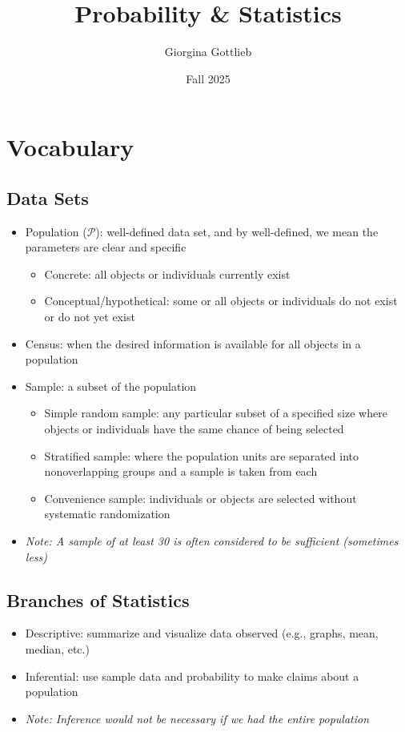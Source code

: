 \documentclass[12pt]{article}
\title{\textbf{Probability \& Statistics}}
\author{Giorgina Gottlieb}
\date{Fall 2025}
\begin{document}
\maketitle

\section{Vocabulary}

\subsection{Data Sets}
    \begin{itemize}
        \item Population ($\mathcal{P}$): well-defined data set, and by well-defined, we mean the parameters are clear and specific
            \begin{itemize}[label=--]
            \item Concrete: all objects or individuals currently exist
            \item Conceptual/hypothetical: some or all objects or individuals do not exist or do not yet exist
            \end{itemize}
        \item Census: when the desired information is available for all objects in a population
        \item Sample: a subset of the population
            \begin{itemize}[label=--]
                \item Simple random sample: any particular subset of a specified size where objects or individuals have the same chance of being selected
                \item Stratified sample: where the population units are separated into nonoverlapping groups and a sample is taken from each
                \item Convenience sample: individuals or objects are selected without systematic randomization
            \end{itemize}
        \item[] \textit{Note: A sample of at least 30 is often considered to be sufficient (sometimes less)}
    \end{itemize}

\subsection{Branches of Statistics}
    \begin{itemize}
        \item Descriptive: summarize and visualize data observed (e.g., graphs, mean, median, etc.)
        \item Inferential: use sample data and probability to make claims about a population
        \item[] \textit{Note: Inference would not be necessary if we had the entire population} 
    \end{itemize}
\end{document}
